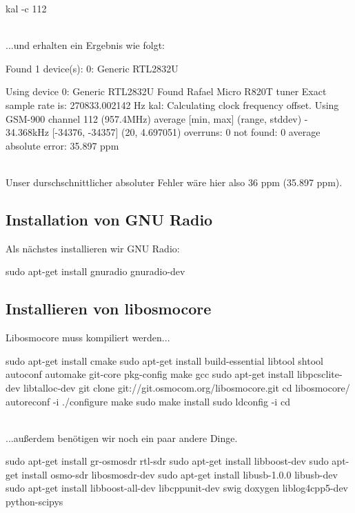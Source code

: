\documentclass{scrreprt}
\begin{document}
\begin{code}
kal -c 112 
\end{code}

\noindent\\...und erhalten ein Ergebnis wie folgt:

\begin{code}
Found 1 device(s):
  0:  Generic RTL2832U

Using device 0: Generic RTL2832U
Found Rafael Micro R820T tuner
Exact sample rate is: 270833.002142 Hz
kal: Calculating clock frequency offset.
Using GSM-900 channel 112 (957.4MHz)
average		[min, max]	(range, stddev)
- 34.368kHz		[-34376, -34357]	(20, 4.697051)
overruns: 0
not found: 0
average absolute error: 35.897 ppm
\end{code}

\noindent\\Unser durschschnittlicher absoluter Fehler wäre hier also 36 ppm (35.897 ppm).

\subsection{Installation von GNU Radio}

Als nächstes installieren wir GNU Radio:

\begin{code}
sudo apt-get install gnuradio gnuradio-dev
\end{code}

\subsection{Installieren von libosmocore}

Libosmocore muss kompiliert werden...

\begin{code}[numbers=left, stepnumber=1]
sudo apt-get install cmake
sudo apt-get install build-essential libtool shtool autoconf automake git-core pkg-config make gcc
sudo apt-get install libpcsclite-dev libtalloc-dev
git clone git://git.osmocom.org/libosmocore.git
cd libosmocore/
autoreconf -i
./configure
make
sudo make install
sudo ldconfig -i
cd
\end{code}

\noindent\\...außerdem benötigen wir noch ein paar andere Dinge.

\begin{code}[numbers=left, stepnumber=1]
sudo apt-get install gr-osmosdr rtl-sdr
sudo apt-get install libboost-dev
sudo apt-get install osmo-sdr libosmosdr-dev
sudo apt-get install libusb-1.0.0 libusb-dev
sudo apt-get install libboost-all-dev libcppunit-dev swig doxygen liblog4cpp5-dev python-scipys
\end{code}
\end{document}
